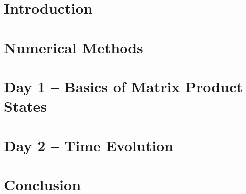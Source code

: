 \documentclass[
headings=optiontohead,              %
12pt,                               %
DIV=13,                             %
open=right,                         %
toc=bibliographynumbered            %
]{scrreport}
\begin{document}
    \thispagestyle{empty}           %
    \cleardoublepage                %
    \pagestyle{scrheadings}         %
    \clearpairofpagestyles
    \ihead{\leftmark}
    \ohead{\Ifstr{\leftmark}{\rightmark}{}{\rightmark}}
    \cfoot*{\pagemark}


    \cleardoublepage
    

    \chapter{Introduction}
    

    \chapter{Numerical Methods}
    

    \chapter{Day 1 -- Basics of Matrix Product States}
    

    \chapter{Day 2 -- Time Evolution}
    

    \chapter{Conclusion}
    

    
\end{document}
